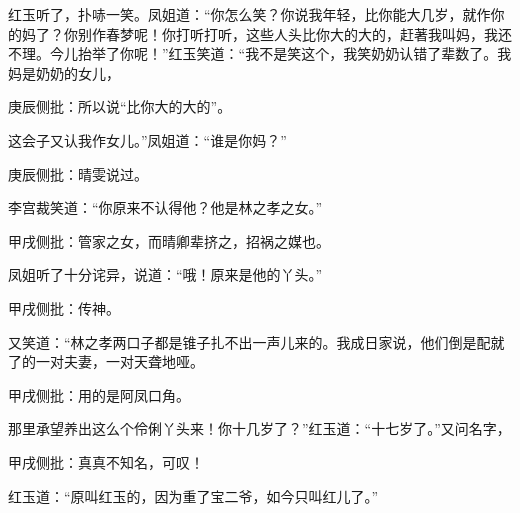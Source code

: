 \begin{parag}
    红玉听了，扑哧一笑。凤姐道：“你怎么笑？你说我年轻，比你能大几岁，就作你的妈了？你别作春梦呢！你打听打听，这些人头比你大的大的，赶著我叫妈，我还不理。今儿抬举了你呢！”红玉笑道：“我不是笑这个，我笑奶奶认错了辈数了。我妈是奶奶的女儿，\begin{note}庚辰侧批：所以说“比你大的大的”。\end{note}这会子又认我作女儿。”凤姐道：“谁是你妈？”\begin{note}庚辰侧批：晴雯说过。\end{note}李宫裁笑道：“你原来不认得他？他是林之孝之女。”\begin{note}甲戌侧批：管家之女，而晴卿辈挤之，招祸之媒也。\end{note}凤姐听了十分诧异，说道：“哦！原来是他的丫头。”\begin{note}甲戌侧批：传神。\end{note}又笑道：“林之孝两口子都是锥子扎不出一声儿来的。我成日家说，他们倒是配就了的一对夫妻，一对天聋地哑。\begin{note}甲戌侧批：用的是阿凤口角。\end{note}那里承望养出这么个伶俐丫头来！你十几岁了？”红玉道：“十七岁了。”又问名字，\begin{note}甲戌侧批：真真不知名，可叹！\end{note}红玉道：“原叫红玉的，因为重了宝二爷，如今只叫红儿了。”
\end{parag}


